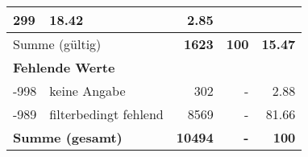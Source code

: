 \begin{longtable}{lXrrr}
       \num{299} &
       \num[round-mode=places,round-precision=2]{18,42} &
         \num[round-mode=places,round-precision=2]{2,85} \\
     \midrule
     \multicolumn{2}{l}{Summe (gültig)} &
       \textbf{\num{1623}} &
     \textbf{100} &
       \textbf{\num[round-mode=places,round-precision=2]{15,47}} \\
     \multicolumn{5}{l}{\textbf{Fehlende Werte}}\\
       -998 &
       keine Angabe &
         \num{302} &
        - &
         \num[round-mode=places,round-precision=2]{2,88} \\
       -989 &
       filterbedingt fehlend &
         \num{8569} &
        - &
         \num[round-mode=places,round-precision=2]{81,66} \\
     \midrule
     \multicolumn{2}{l}{\textbf{Summe (gesamt)}} &
          \textbf{\num{10494}} &
        \textbf{-} &
        \textbf{100} \\
     \bottomrule
     \end{longtable}
     
